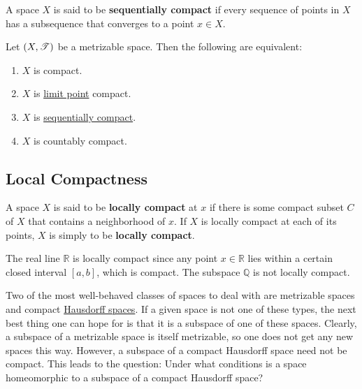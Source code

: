   \begin{definition}
    \label{def:sequentially-compact}
    A space $X$ is said to be \textbf{sequentially compact} if every sequence of points in $X$ has a subsequence that converges to a point $x \in X$. 
  \end{definition}

  \begin{theorem}
    \label{thm:equivalence-of-compactness-in-metrizable-spaces}
    Let $(X, \operatorname{\mathscr{T}})$ be a metrizable space. Then the following are equivalent: 
    \begin{enumerate}
      \item $X$ is compact. 
      \item $X$ is \hyperref[def:limit-point]{limit point} compact. 
      \item $X$ is \hyperref[def:sequentially-compact]{sequentially compact}. 
      \item $X$ is countably compact. 
    \end{enumerate}
  \end{theorem}

\subsection{Local Compactness}

  \begin{definition}
    \label{def:locally-compact}
    A space $X$ is said to be \textbf{locally compact} at $x$ if there is some compact subset $C$ of $X$ that contains a neighborhood of $x$. If $X$ is locally compact at each of its points, $X$ is simply to be \textbf{locally compact}. 
  \end{definition}

  \begin{example}
    \label{ex:r-is-locally-compact}
    The real line $\mathbb{R}$ is locally compact since any point $x \in \mathbb{R}$ lies within a certain closed interval $[a,b]$, which is compact. The subspace $\mathbb{Q}$ is not locally compact. 
  \end{example}

  Two of the most well-behaved classes of spaces to deal with are metrizable spaces and compact \hyperref[def:hausdorff-space]{Hausdorff spaces}. If a given space is not one of these types, the next best thing one can hope for is that it is a subspace of one of these spaces. Clearly, a subspace of a metrizable space is itself metrizable, so one does not get any new spaces this way. However, a subspace of a compact Hausdorff space need not be compact. This leads to the question: Under what conditions is a space homeomorphic to a subspace of a compact Hausdorff space? 

